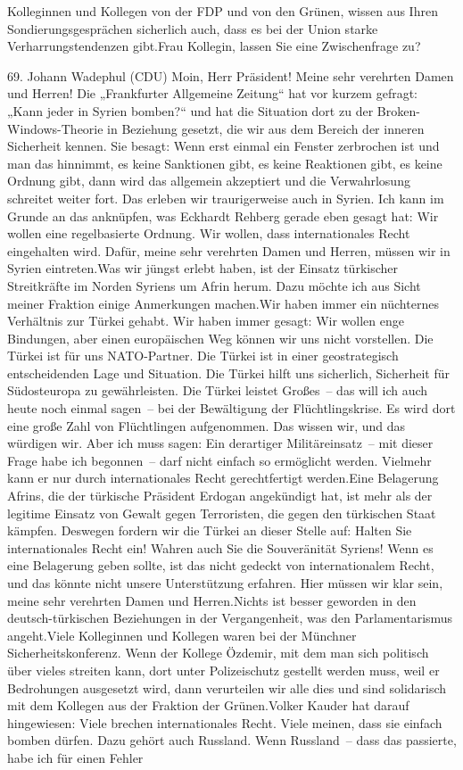 \documentclass{article}
\begin{document}
Kolleginnen und Kollegen von der FDP und von den Grünen, wissen aus Ihren Sondierungsgesprächen sicherlich auch, dass es bei der Union starke Verharrungstendenzen gibt.Frau Kollegin, lassen Sie eine Zwischenfrage zu?




	69. Johann Wadephul (CDU) Moin, Herr Präsident! Meine sehr verehrten Damen und Herren! Die „Frankfurter Allgemeine Zeitung“ hat vor kurzem gefragt: „Kann jeder in Syrien bomben?“ und hat die Situation dort zu der Broken-Windows-Theorie in Beziehung gesetzt, die wir aus dem Bereich der inneren Sicherheit kennen. Sie besagt: Wenn erst einmal ein Fenster zerbrochen ist und man das hinnimmt, es keine Sanktionen gibt, es keine Reaktionen gibt, es keine Ordnung gibt, dann wird das allgemein akzeptiert und die Verwahrlosung schreitet weiter fort. Das erleben wir traurigerweise auch in Syrien. Ich kann im Grunde an das anknüpfen, was Eckhardt Rehberg gerade eben gesagt hat: Wir wollen eine regelbasierte Ordnung. Wir wollen, dass internationales Recht eingehalten wird. Dafür, meine sehr verehrten Damen und Herren, müssen wir in Syrien eintreten.Was wir jüngst erlebt haben, ist der Einsatz türkischer Streitkräfte im Norden Syriens um Afrin herum. Dazu möchte ich aus Sicht meiner Fraktion einige Anmerkungen machen.Wir haben immer ein nüchternes Verhältnis zur Türkei gehabt. Wir haben immer gesagt: Wir wollen enge Bindungen, aber einen europäischen Weg können wir uns nicht vorstellen. Die Türkei ist für uns NATO-Partner. Die Türkei ist in einer geostrategisch entscheidenden Lage und Situation. Die Türkei hilft uns sicherlich, Sicherheit für Südosteuropa zu gewährleisten. Die Türkei leistet Großes – das will ich auch heute noch einmal sagen – bei der Bewältigung der Flüchtlingskrise. Es wird dort eine große Zahl von Flüchtlingen aufgenommen. Das wissen wir, und das würdigen wir. Aber ich muss sagen: Ein derartiger Militäreinsatz – mit dieser Frage habe ich begonnen – darf nicht einfach so ermöglicht werden. Vielmehr kann er nur durch internationales Recht gerechtfertigt werden.Eine Belagerung Afrins, die der türkische Präsident Erdogan angekündigt hat, ist mehr als der legitime Einsatz von Gewalt gegen Terroristen, die gegen den türkischen Staat kämpfen. Deswegen fordern wir die Türkei an dieser Stelle auf: Halten Sie internationales Recht ein! Wahren auch Sie die Souveränität Syriens! Wenn es eine Belagerung geben sollte, ist das nicht gedeckt von internationalem Recht, und das könnte nicht unsere Unterstützung erfahren. Hier müssen wir klar sein, meine sehr verehrten Damen und Herren.Nichts ist besser geworden in den deutsch-türkischen Beziehungen in der Vergangenheit, was den Parlamentarismus angeht.Viele Kolleginnen und Kollegen waren bei der Münchner Sicherheitskonferenz. Wenn der Kollege Özdemir, mit dem man sich politisch über vieles streiten kann, dort unter Polizeischutz gestellt werden muss, weil er Bedrohungen ausgesetzt wird, dann verurteilen wir alle dies und sind solidarisch mit dem Kollegen aus der Fraktion der Grünen.Volker Kauder hat darauf hingewiesen: Viele brechen internationales Recht. Viele meinen, dass sie einfach bomben dürfen. Dazu gehört auch Russland. Wenn Russland – dass das passierte, habe ich für einen Fehler 
\end{document}
